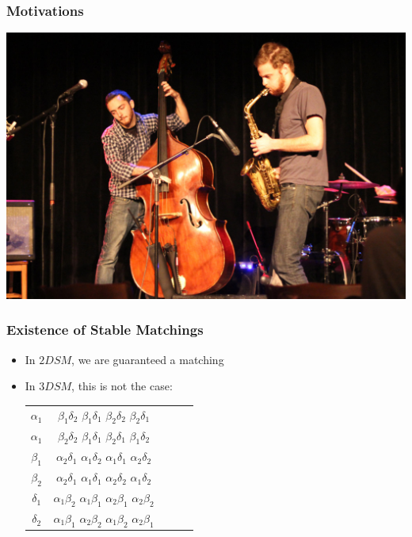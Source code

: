\documentclass[mathserif,serif]{beamer}
\begin{document}
\begin{frame}
	\frametitle{Motivations}

	\includegraphics[width=\textwidth]{mwsb-jazz}
\end{frame}



\begin{frame}
  \frametitle{Existence of Stable Matchings}

  \begin{itemize}
  \item In $2DSM$, we are guaranteed a matching
  \item In $3DSM$, this is not the case:
    \begin{center}
      \begin{tabular}{c | c c c c}
        $\alpha_1$ & $\beta_1\delta_2$ $\beta_1\delta_1$ $\beta_2\delta_2$ $\beta_2\delta_1$ \\
        $\alpha_1$ & $\beta_2\delta_2$ $\beta_1\delta_1$ $\beta_2\delta_1$ $\beta_1\delta_2$ \\ \hline
        $\beta_1$ & $\alpha_2\delta_1$ $\alpha_1\delta_2$ $\alpha_1\delta_1$ $\alpha_2\delta_2$ \\
        $\beta_2$ & $\alpha_2\delta_1$ $\alpha_1\delta_1$ $\alpha_2\delta_2$ $\alpha_1\delta_2$ \\ \hline
        $\delta_1$ & $\alpha_1\beta_2$ $\alpha_1\beta_1$ $\alpha_2\beta_1$ $\alpha_2\beta_2$ \\
        $\delta_2$ & $\alpha_1\beta_1$ $\alpha_2\beta_2$ $\alpha_1\beta_2$ $\alpha_2\beta_1$ \\
      \end{tabular}
    \end{center}
  \end{itemize}
\end{frame}
\end{document}
